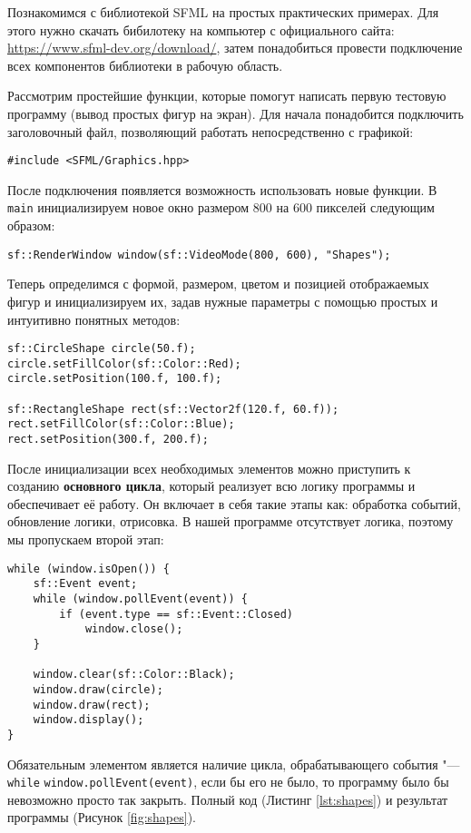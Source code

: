 Познакомимся с библиотекой SFML на простых практических примерах. Для этого нужно скачать бибилотеку на компьютер с официального сайта: \url{https://www.sfml-dev.org/download/}, затем понадобиться провести подключение всех компонентов библиотеки в рабочую область.

Рассмотрим простейшие функции, которые помогут написать первую тестовую программу (вывод простых фигур на экран). Для начала понадобится подключить заголовочный файл, позволяющий работать непосредственно с графикой:

\begin{lstlisting}[style=myStyle, numbers=none]
#include <SFML/Graphics.hpp>
\end{lstlisting}

После подключения появляется возможность использовать новые функции. В \texttt{main} инициализируем новое окно размером 800 на 600 пикселей следующим образом:

\begin{lstlisting}[style=myStyle, numbers=none]
sf::RenderWindow window(sf::VideoMode(800, 600), "Shapes");
\end{lstlisting}

Теперь определимся с формой, размером, цветом и позицией отображаемых фигур и инициализируем их, задав нужные параметры с помощью простых и интуитивно понятных методов:

\begin{lstlisting}[style=myStyle]
sf::CircleShape circle(50.f);
circle.setFillColor(sf::Color::Red);
circle.setPosition(100.f, 100.f);

sf::RectangleShape rect(sf::Vector2f(120.f, 60.f));
rect.setFillColor(sf::Color::Blue);
rect.setPosition(300.f, 200.f);
\end{lstlisting}

После инициализации всех необходимых элементов можно приступить к созданию \textbf{основного цикла}, который реализует всю логику программы и обеспечивает её работу. Он включает в себя такие этапы как: обработка событий, обновление логики, отрисовка. В нашей программе отсутствует логика, поэтому мы пропускаем второй этап:

\begin{lstlisting}[style=myStyle]
while (window.isOpen()) {
    sf::Event event;
    while (window.pollEvent(event)) {
        if (event.type == sf::Event::Closed)
            window.close();
    }

    window.clear(sf::Color::Black);
    window.draw(circle);
    window.draw(rect);
    window.display();
}
\end{lstlisting}

Обязательным элементом является наличие цикла, обрабатывающего события "--- \texttt{\color{blue}while} \texttt{window.pollEvent(event)}, если бы его не было, то программу было бы невозможно просто так закрыть. Полный код (Листинг \ref{lst:shapes}) и результат программы (Рисунок \ref{fig:shapes}).
